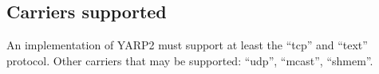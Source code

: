 \documentclass[a4]{article}
\begin{document}





\subsection{Carriers supported}

An implementation of YARP2 must support at least the ``tcp''
and ``text'' protocol.  Other carriers that may be supported:
``udp'', ``mcast'', ``shmem''.
\end{document}
